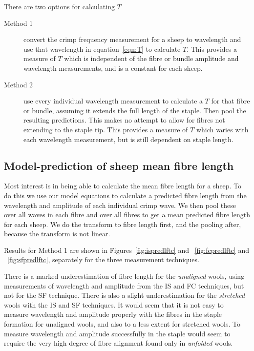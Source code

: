 \documentclass[titlepage,10pt]{article}  %
\begin{document}
There are two options for calculating $T$

\begin{description}
\item[Method 1] convert the crimp frequency measurement for a sheep to wavelength and use that wavelength in equation~\ref{eqn:T} to calculate $T$. This provides a measure of $T$ which is independent of the fibre or bundle amplitude and wavelength measurements, and is a constant for each sheep.
\item[Method 2] use every individual wavelength measurement to calculate a $T$ for that fibre or bundle, assuming it extends the full length of the staple. Then pool the resulting predictions. This makes no attempt to allow for fibres not extending to the staple tip. This provides a measure of $T$ which varies with each wavelength measurement, but is still dependent on staple length.
\end{description}

\subsection{Model-prediction of sheep mean fibre length}
Most interest is in being able to calculate the mean fibre length for a sheep. To do this we use our model equations to calculate a predicted fibre length from the wavelength and amplitude of each individual crimp wave. We then pool these over all waves in each fibre and over all fibres to get a mean predicted fibre length for each sheep. We do the transform to fibre length first, and the pooling after, because the transform is not linear.

Results for Method 1 are shown in Figures~\ref{fig:ispredlftc} and ~\ref{fig:fcpredlftc} and ~\ref{fig:sfpredlftc}, separately for the three measurement techniques. 





There is a marked underestimation of fibre length for the {\em unaligned} wools, using measurements of wavelength and amplitude from the IS and FC techniques, but not for the SF technique.  There is also a slight underestimation for the {\em stretched} wools with the IS and SF techniques. It would seem that it is not easy to measure wavelength and amplitude properly with the fibres in the staple formation for unaligned wools, and also to a less extent for stretched wools. To measure wavelength and amplitude successfully in the staple would seem to require the very high degree of fibre alignment found only in {\em unfolded} wools. 
\end{document}
